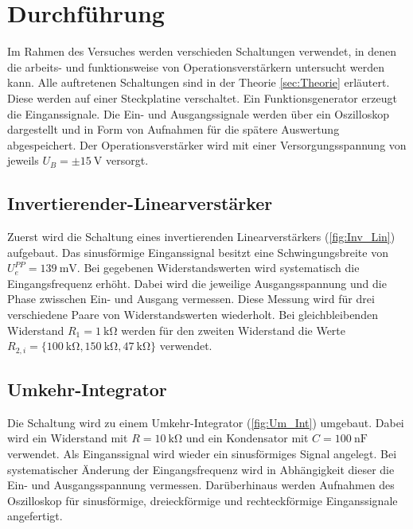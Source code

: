 \section{Durchführung}
\label{sec:Durchführung}

Im Rahmen des Versuches werden verschieden Schaltungen verwendet, in denen die arbeits- und funktionsweise von Operationsverstärkern untersucht werden kann.
Alle auftretenen Schaltungen sind in der Theorie \ref{sec:Theorie} erläutert.
Diese werden auf einer Steckplatine verschaltet.
Ein Funktionsgenerator erzeugt die Einganssignale.
Die Ein- und Ausgangssignale werden über ein Oszilloskop dargestellt und in Form von Aufnahmen für die spätere Auswertung abgespeichert. 
Der Operationsverstärker wird mit einer Versorgungsspannung von jeweils $U_B=\pm\SI{15}{\volt}$ versorgt.




\subsection{Invertierender-Linearverstärker}
\label{sub:Intlin}
Zuerst wird die Schaltung eines invertierenden Linearverstärkers (\ref{fig:Inv_Lin}) aufgebaut. 
Das sinusförmige Einganssignal besitzt eine Schwingungsbreite von $U_e^{PP}=\SI{139}{\milli\volt}$.
Bei gegebenen Widerstandswerten wird systematisch die Eingangsfrequenz erhöht.
Dabei wird die jeweilige Ausgangsspannung und die Phase zwisschen Ein- und Ausgang vermessen.
Diese Messung wird für drei verschiedene Paare von Widerstandswerten wiederholt.
Bei gleichbleibenden Widerstand $R_1=\SI{1}{\kilo\ohm}$ werden für den zweiten Widerstand die Werte $R_{2,i}=\{\SI{100}{\kilo\ohm},\SI{150}{\kilo\ohm},\SI{47}{\kilo\ohm}\}$ verwendet.

\subsection{Umkehr-Integrator}
\label{sub:Um_Int}

Die Schaltung wird zu einem Umkehr-Integrator (\ref{fig:Um_Int}) umgebaut. 
Dabei wird ein Widerstand mit $R = \SI{10}{\kilo\ohm}$ und ein Kondensator mit $C=\SI{100}{\nano\farad}$ verwendet.
Als Einganssignal wird wieder ein sinusförmiges Signal angelegt.
Bei systematischer Änderung der Eingangsfrequenz wird in Abhängigkeit dieser die Ein- und Ausgangsspannung vermessen.
Darüberhinaus werden Aufnahmen des Oszilloskop für sinusförmige, dreieckförmige und rechteckförmige Einganssignale angefertigt.



